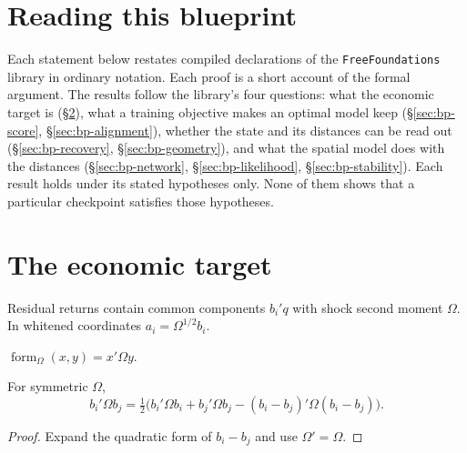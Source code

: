 
\section{Reading this blueprint}\label{sec:bp-reading}

Each statement below restates compiled declarations of the
\texttt{FreeFoundations}
library in ordinary notation. Each proof is a short account of the formal
argument. The results follow the library's four questions: what the economic
target is (\S\ref{sec:bp-target}), what a training objective makes an optimal
model keep (\S\ref{sec:bp-score}, \S\ref{sec:bp-alignment}), whether the state
and its distances can be read out (\S\ref{sec:bp-recovery},
\S\ref{sec:bp-geometry}), and what the spatial model does with the distances
(\S\ref{sec:bp-network}, \S\ref{sec:bp-likelihood}, \S\ref{sec:bp-stability}).
Each result holds under its stated hypotheses only. None of them shows that a
particular checkpoint satisfies those hypotheses.

\section{The economic target}\label{sec:bp-target}

Residual returns contain common components $b_i'q$ with shock second moment
$\Omega$. In whitened coordinates $a_i=\Omega^{1/2}b_i$.

\begin{definition}\label{def:exposure-form}
  \leanok
  $\operatorname{form}_\Omega(x,y)=x'\Omega y$.
\end{definition}

\begin{lemma}\label{thm:exposure-covariance}
  \leanok
  For symmetric $\Omega$,
  \[
    b_i'\Omega b_j=\tfrac12\bigl(b_i'\Omega b_i+b_j'\Omega b_j
    -(b_i-b_j)'\Omega(b_i-b_j)\bigr).
  \]
\end{lemma}
\begin{proof}\leanok
  Expand the quadratic form of $b_i-b_j$ and use $\Omega'=\Omega$.
\end{proof}

